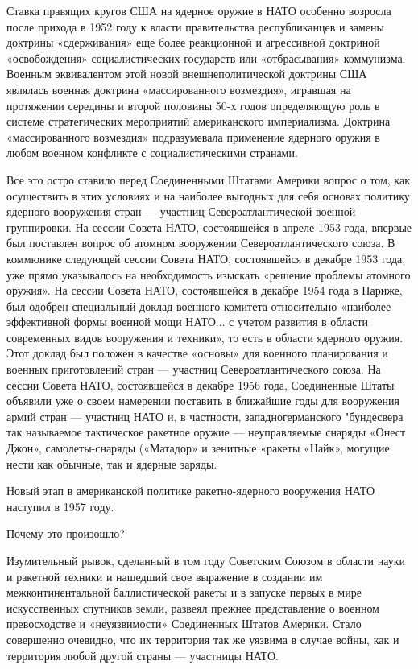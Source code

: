 \documentclass[12pt, a4paper, openany]{book}
\begin{document}
	Ставка правящих кругов США на ядерное оружие в НАТО особенно возросла после прихода в 1952 году к власти правительства республиканцев и замены доктрины «сдерживания» еще более реакционной и агрессивной доктриной «освобождения» социалистических государств или «отбрасывания» коммунизма. Военным эквивалентом этой новой внешнеполитической доктрины США являлась военная доктрина «массированного возмездия», игравшая на протяжении середины и второй половины 50-х годов определяющую роль в системе стратегических мероприятий американского империализма. Доктрина «массированного возмездия» подразумевала применение ядерного оружия в любом военном конфликте с социалистическими странами.
	
	Все это остро ставило перед Соединенными Штатами Америки вопрос о том, как осуществить в этих условиях и на наиболее выгодных для себя основах политику ядерного вооружения стран — участниц Североатлантической военной группировки. На сессии Совета НАТО, состоявшейся в апреле 1953 года, впервые был поставлен вопрос об атомном вооружении Североатлантического союза. В коммюнике следующей сессии Совета НАТО, состоявшейся в декабре 1953 года, уже прямо указывалось на необходимость изыскать «решение проблемы атомного оружия». На сессии Совета НАТО, состоявшейся в декабре 1954 года в Париже, был одобрен специальный доклад военного комитета относительно «наиболее эффективной формы военной мощи НАТО... с учетом развития в области современных видов вооружения и техники», то есть в области ядерного оружия. Этот доклад был положен в качестве «основы» для военного планирования и военных приготовлений стран — участниц Североатлантического союза. На сессии Совета НАТО, состоявшейся в декабре 1956 года, Соединенные Штаты объявили уже о своем намерении поставить в ближайшие годы для вооружения армий стран — участниц НАТО и, в частности, западногерманского "бундесвера так называемое тактическое ракетное оружие — неуправляемые снаряды «Онест Джон», самолеты-снаряды («Матадор» и зенитные «ракеты «Найк», могущие нести как обычные, так и ядерные заряды.
	
	Новый этап в американской политике ракетно-ядерного вооружения НАТО наступил в 1957 году.
	
	Почему это произошло?
	
	
	Изумительный рывок, сделанный в том году Советским Союзом в области науки и ракетной техники и нашедший свое выражение в создании им межконтинентальной баллистической ракеты и в запуске первых в мире искусственных спутников земли, развеял прежнее представление о военном превосходстве и «неуязвимости» Соединенных Штатов Америки. Стало совершенно очевидно, что их территория так же уязвима в случае войны, как и территория любой другой страны — участницы НАТО.
	
\end{document}
